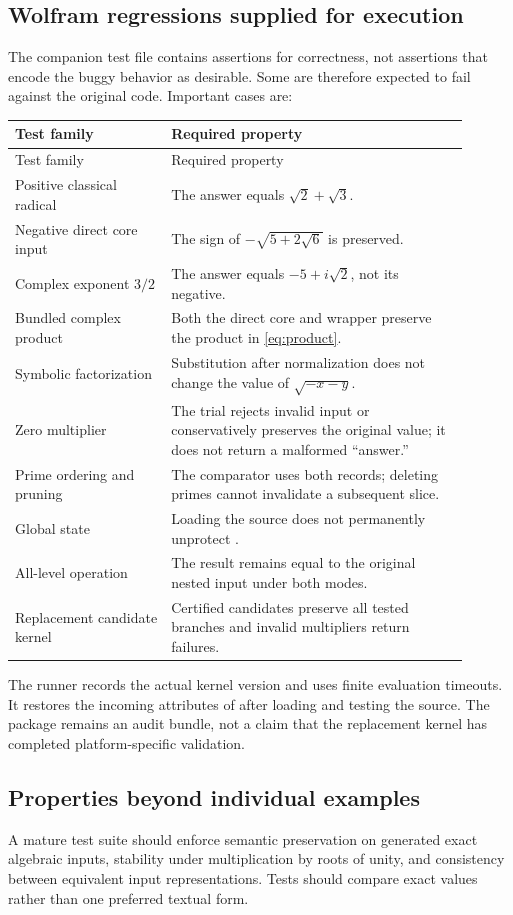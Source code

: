 \documentclass[11pt,letterpaper]{article}
\newcommand{\code}[1]{\texttt{\detokenize{#1}}}
\theoremstyle{definition}
\begin{document}
\subsection{Wolfram regressions supplied for execution}
The companion test file contains assertions for correctness, not assertions that
encode the buggy behavior as desirable. Some are therefore expected to fail against
the original code. Important cases are:
\small
\begin{longtable}{@{}p{0.31\linewidth}p{0.59\linewidth}@{}}
\toprule Test family & Required property\\\midrule
\endfirsthead
\toprule Test family & Required property\\\midrule
\endhead
Positive classical radical & The answer equals $\sqrt2+\sqrt3$.\\
Negative direct core input & The sign of $-\sqrt{5+2\sqrt6}$ is preserved.\\
Complex exponent $3/2$ & The answer equals $-5+i\sqrt2$, not its negative.\\
Bundled complex product & Both the direct core and wrapper preserve the product in \eqref{eq:product}.\\
Symbolic factorization & Substitution after normalization does not change the value of $\sqrt{-x-y}$.\\
Zero multiplier & The trial rejects invalid input or conservatively preserves the original value; it does not return a malformed ``answer.''\\
Prime ordering and pruning & The comparator uses both records; deleting primes cannot invalidate a subsequent slice.\\
Global state & Loading the source does not permanently unprotect \code{Print}.\\
All-level operation & The result remains equal to the original nested input under both modes.\\
Replacement candidate kernel & Certified candidates preserve all tested branches and invalid multipliers return failures.\\
\bottomrule
\end{longtable}
\normalsize
The runner records the actual kernel version and uses finite evaluation timeouts.
It restores the incoming attributes of \code{Print} after loading and testing the
source. The package remains an audit bundle, not a claim that the replacement
kernel has completed platform-specific validation.

\subsection{Properties beyond individual examples}
A mature test suite should enforce semantic preservation on generated exact
algebraic inputs, stability under multiplication by roots of unity, and consistency
between equivalent input representations. Tests should compare exact values rather
than one preferred textual form.
\end{document}
